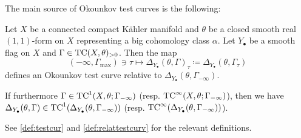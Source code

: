 The main source of Okounkov test curves is the following:
\begin{theorem}\label{thm:Okountescurvex}
Let $X$ be a connected compact Kähler manifold and $\theta$ be a closed smooth real $(1,1)$-form on $X$ representing a big cohomology class $\alpha$.
    Let $Y_{\bullet}$ be a smooth flag on $X$ and $\Gamma\in \mathrm{TC}(X,\theta)_{>0}$.
    Then the map
    \[
    (-\infty,\Gamma_{\max})\ni \tau\mapsto \Delta_{Y_{\bullet}}(\theta,\Gamma)_{\tau}\coloneqq \Delta_{Y_{\bullet}}(\theta,\Gamma_{\tau})
    \]
    defines an Okounkov test curve relative to $\Delta_{Y_{\bullet}}(\theta,\Gamma_{-\infty})$.

    If furthermore $\Gamma\in \mathrm{TC}^1(X,\theta;\Gamma_{-\infty})$ (resp. $\mathrm{TC}^{\infty}(X,\theta;\Gamma_{-\infty})$), then we have $\Delta_{Y_{\bullet}}(\theta,\Gamma)\in \mathrm{TC}^1(\Delta_{Y_{\bullet}}(\theta,\Gamma_{-\infty}))$ (resp. $\mathrm{TC}^{\infty}(\Delta_{Y_{\bullet}}(\theta,\Gamma_{-\infty}))$).
\end{theorem}
See \cref{def:testcur} and \cref{def:relattestcurv} for the relevant definitions.
